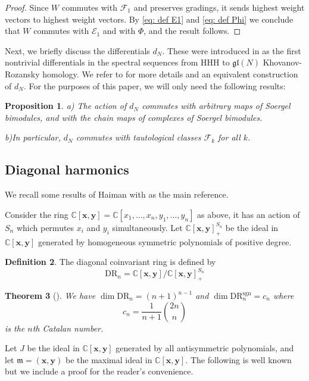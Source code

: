 \documentclass{amsart}
\newcommand{\C}{\mathbb{C}}
\newcommand{\xx}{\mathbf{x}}
\newcommand{\yy}{\mathbf{y}}
\newcommand{\mm}{\mathfrak{m}}
\newcommand{\DR}{\mathrm{DR}}
\newcommand{\sgn}{\mathrm{sgn}}
\newcommand{\CE}{\mathcal{E}}
\newcommand{\CF}{\mathcal{F}}
\newcommand{\HHH}{\mathrm{HHH}}
\numberwithin{equation}{section}
\newtheorem{theorem}{Theorem}[section]
\newtheorem{proposition}[theorem]{Proposition}
\theoremstyle{definition}
\newtheorem{definition}[theorem]{Definition}
\begin{document}
\begin{proof}
Since $W$ commutes with $\CF_1$ and preserves gradings, it sends highest weight vectors to highest weight vectors. By \eqref{eq: def E1} and \eqref{eq: def Phi} we conclude that $W$ commutes with $\CE_1$ and with $\Phi$, and the result follows.
\end{proof}

Next, we briefly discuss the differentials $d_N$. These were introduced in \cite{Rasmussen} as the first nontrivial differentials in the spectral sequences from $\HHH$ to $\mathfrak{gl}(N)$ Khovanov-Rozansky homology. We refer to \cite[Section 3]{BGHW} for more details and an equivalent construction of $d_N$. 
For the purposes of this paper, we will only need the following results:

\begin{proposition}\cite[Proposition 3.18]{BGHW}
\label{prop: dN functorial}
a) The action of $d_N$ commutes with arbitrary   maps of Soergel bimodules, and with the chain maps of complexes of Soergel bimodules.

b)In particular, $d_N$ commutes with tautological classes $\CF_k$ for all $k$. 
\end{proposition}





\subsection{Diagonal harmonics}

We recall some results of Haiman with \cite{HaimanInv} as the main reference. 

Consider the ring $\C[\xx,\yy]=\C[x_1,\ldots,x_n,y_1,\ldots,y_n]$ as above, it has an action of $S_n$ which permutes $x_i$ and $y_i$ simultaneously. Let $\C[\xx,\yy]^{S_n}_{+}$ be the ideal in $\C[\xx,\yy]$ generated by homogeneous symmetric polynomials of positive degree. 

\begin{definition}
The diagonal coinvariant ring is defined by 
$$
\DR_n=\C[\xx,\yy]/\C[\xx,\yy]^{S_n}_{+}
$$
\end{definition}

\begin{theorem}[\cite{HaimanInv}]
We have $\dim \DR_n=(n+1)^{n-1}$ and $\dim \DR_n^{\sgn}=c_n$ where 
$$
c_n=\frac{1}{n+1}\binom{2n}{n}
$$
is the $n$th Catalan number.
\end{theorem}

Let $J$ be the ideal in $\C[\xx,\yy]$ generated by all antisymmetric polynomials, and let $\mm=(\xx,\yy)$ be the maximal ideal in $\C[\xx,\yy]$. The following is well known but we include a  proof for the reader's convenience. 
\end{document}
